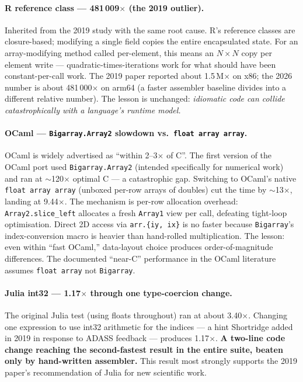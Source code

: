 \documentclass[11pt,a4paper]{article}
\begin{document}
\paragraph{R reference class --- 481\,009$\times$ (the 2019 outlier).}
Inherited from the 2019 study with the same root cause. R's
reference classes are closure-based; modifying a single field copies
the entire encapsulated state. For an array-modifying method called
per-element, this means an $N\times N$ copy per element write ---
quadratic-times-iterations work for what should have been
constant-per-call work. The 2019 paper reported about 1.5\,M$\times$
on x86; the 2026 number is about 481\,000$\times$ on arm64 (a faster
assembler baseline divides into a different relative number). The lesson
is unchanged: \emph{idiomatic code can collide catastrophically with
a language's runtime model.}

\paragraph{OCaml --- \texttt{Bigarray.Array2} slowdown vs.\ \texttt{float array array}.}
OCaml is widely advertised as ``within 2--3$\times$ of C''. The
first version of the OCaml port used \texttt{Bigarray.Array2}
(intended specifically for numerical work) and ran at $\sim$120$\times$
optimal C --- a catastrophic gap. Switching to OCaml's native
\texttt{float array array} (unboxed per-row arrays of doubles) cut
the time by $\sim$13$\times$, landing at 9.44$\times$. The mechanism is
per-row allocation overhead: \verb|Array2.slice_left| allocates a
fresh \verb|Array1| view per call, defeating tight-loop optimisation.
Direct 2D access via \verb|arr.{iy, ix}| is no faster because
\verb|Bigarray|'s index-conversion macro is heavier than hand-rolled
multiplication. The lesson: even within ``fast OCaml,'' data-layout
choice produces order-of-magnitude differences. The documented
``near-C'' performance in the OCaml literature assumes
\texttt{float array} not \texttt{Bigarray}.

\paragraph{Julia int32 --- 1.17$\times$ through one type-coercion change.}
The original Julia test (using floats throughout) ran at about
3.40$\times$. Changing one expression to use int32 arithmetic for
the indices --- a hint Shortridge added in 2019 in response to
ADASS feedback --- produces 1.17$\times$. \textbf{A two-line code
change reaching the second-fastest result in the entire suite,
beaten only by hand-written assembler.} This result most strongly
supports the 2019 paper's recommendation of Julia for new scientific
work.
\end{document}
